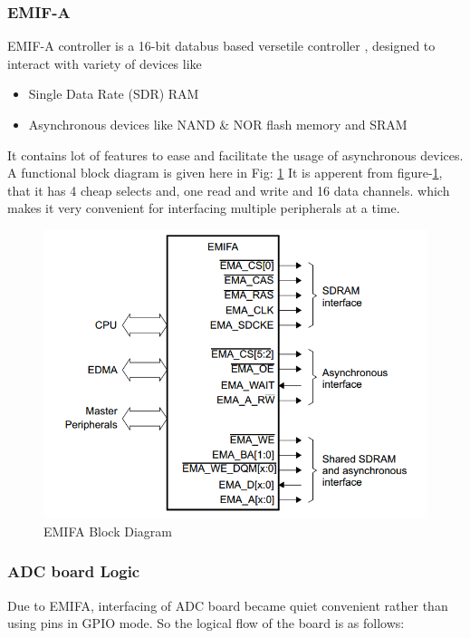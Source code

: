 \subsubsection{EMIF-A}
EMIF-A controller is a 16-bit databus based versetile controller \cite{uguide:emifa}, designed to interact with variety of devices like 
\begin{itemize}
\item Single Data Rate (SDR) RAM
\item Asynchronous devices like NAND \& NOR flash memory and SRAM
\end{itemize}
It contains lot of features to ease and facilitate the usage of asynchronous devices. A functional block diagram is given here in Fig: \ref{fig:EMIFA} 
It is apperent from figure-\ref{fig:EMIFA}, that it has 4 cheap selects and, one read and write and 16 data channels. which makes it very convenient for interfacing multiple peripherals at a time. 
\begin{figure}[ht]
\includegraphics[width=\columnwidth]{fig/EMIFA.png}
\caption{EMIFA Block Diagram \cite{uguide:emifa} }
\label{fig:EMIFA}
\end{figure}

\subsubsection{ADC board Logic}
Due to EMIFA, interfacing of ADC board became quiet convenient rather than using pins in GPIO mode. So the logical flow of the board is as follows:

